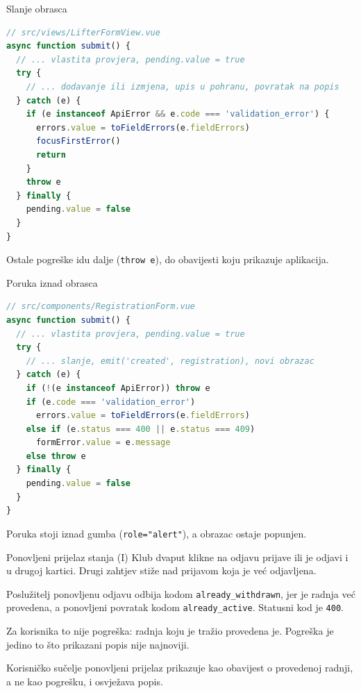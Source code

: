 \begin{frame}[fragile]{Slanje obrasca}
\vspace{-0.3em}
\begin{lstlisting}[language=typescript]
// src/views/LifterFormView.vue
async function submit() {
  // ... vlastita provjera, pending.value = true
  try {
    // ... dodavanje ili izmjena, upis u pohranu, povratak na popis
  } catch (e) {
    if (e instanceof ApiError && e.code === 'validation_error') {
      errors.value = toFieldErrors(e.fieldErrors)
      focusFirstError()
      return
    }
    throw e
  } finally {
    pending.value = false
  }
}
\end{lstlisting}

\vspace{0.1em}
Ostale pogreške idu dalje (\texttt{throw e}), do obavijesti koju prikazuje aplikacija.
\end{frame}

\begin{frame}[fragile]{Poruka iznad obrasca}
\vspace{-0.3em}
\begin{lstlisting}[language=typescript]
// src/components/RegistrationForm.vue
async function submit() {
  // ... vlastita provjera, pending.value = true
  try {
    // ... slanje, emit('created', registration), novi obrazac
  } catch (e) {
    if (!(e instanceof ApiError)) throw e
    if (e.code === 'validation_error')
      errors.value = toFieldErrors(e.fieldErrors)
    else if (e.status === 400 || e.status === 409)
      formError.value = e.message
    else throw e
  } finally {
    pending.value = false
  }
}
\end{lstlisting}

\vspace{0.1em}
Poruka stoji iznad gumba (\texttt{role="alert"}), a obrazac ostaje popunjen.
\end{frame}

\begin{frame}{Ponovljeni prijelaz stanja (I)}
Klub dvaput klikne na odjavu prijave ili je odjavi i u drugoj kartici. Drugi zahtjev stiže nad prijavom koja je već odjavljena.

\vspace{0.9em}
Poslužitelj ponovljenu odjavu odbija kodom \texttt{already\_withdrawn}, jer je radnja već provedena, a ponovljeni povratak kodom \texttt{already\_active}. Statusni kod je \texttt{400}.

\vspace{0.9em}
Za korisnika to nije pogreška: radnja koju je tražio provedena je. Pogreška je jedino to što prikazani popis nije najnoviji.

\vspace{0.9em}
\begin{konvencija}
Korisničko sučelje ponovljeni prijelaz prikazuje kao obavijest o provedenoj radnji, a ne kao pogrešku, i osvježava popis.
\end{konvencija}
\end{frame}

